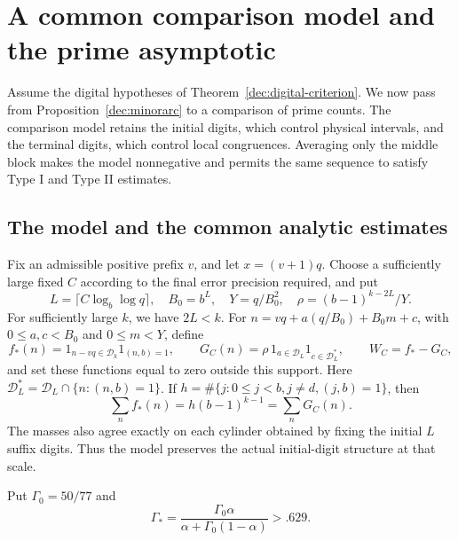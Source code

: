 \documentclass[11pt,a4paper]{article}
\theoremstyle{paperplain}
\numberwithin{equation}{section}
\begin{document}
\section{A common comparison model and the prime asymptotic}
\label{dec:prime-section}

Assume the digital hypotheses of Theorem~\ref{dec:digital-criterion}.
We now pass from Proposition~\ref{dec:minorarc} to a comparison of prime
counts. The comparison model retains the initial digits, which control
physical intervals, and the terminal digits, which control local
congruences. Averaging only the middle block makes the model nonnegative
and permits the same sequence to satisfy Type I and Type II estimates.

\subsection{The model and the common analytic estimates}
\label{dec:model}

Fix an admissible positive prefix $v$, and let $x=(v+1)q$.
Choose a sufficiently large fixed $C$ according to the final error
precision required, and put
\[
 L=\lceil C\log_b\log q\rceil,\quad B_0=b^L,\quad
 Y=q/B_0^2,\quad \rho=(b-1)^{k-2L}/Y.
\]
For sufficiently large $k$, we have $2L<k$.
For $n=vq+a(q/B_0)+B_0m+c$, with $0\le a,c<B_0$ and
$0\le m<Y$, define
\begin{equation}\label{dec:modeldef}
 f_*(n)=1_{n-vq\in\mathcal D_k}1_{(n,b)=1},\qquad
 G_C(n)=\rho\,1_{a\in\mathcal D_L}1_{c\in\mathcal D_L^*},\qquad
 W_C=f_*-G_C,
\end{equation}
and set these functions equal to zero outside this support.
Here $\mathcal D_L^*=\mathcal D_L\cap\{n:(n,b)=1\}$.
If $h=\#\{j:0\le j<b, j\ne d, (j,b)=1\}$, then
\[
 \sum_n f_*(n)=h(b-1)^{k-1}=\sum_nG_C(n).
\]
The masses also agree exactly on each cylinder obtained by fixing
the initial $L$ suffix digits. Thus the model preserves the actual
initial-digit structure at that scale.

Put $\Gamma_0=50/77$ and
\[
 \Gamma_*=\frac{\Gamma_0\alpha}{\alpha+\Gamma_0(1-\alpha)}>.629.
\]
\end{document}
